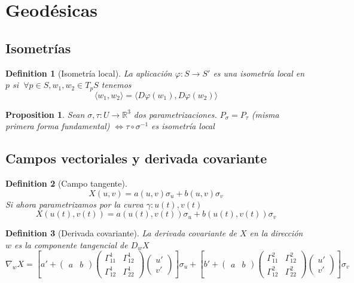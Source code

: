 \documentclass{myclass}
\newtheorem*{definition}{Definition}
\newtheorem*{proposition}{Proposition}
\begin{document}
\section{Geodésicas}
\subsection{Isometrías}
\begin{definition}[Isometría local]
La aplicación $\varphi :S \to  S'$ es una isometría local en $p$ si $\ \forall p\in S, w_1, w_2\in T_pS$ tenemos 
\[
\langle w_1, w_2 \rangle = \langle D\varphi (w_1), D\varphi (w_2) \rangle 
\] 
\end{definition}

\begin{proposition}
Sean $\sigma , \tau :U\to \mathbb{R}^3$ dos parametrizaciones. $P_\sigma  = P_\tau$ (misma primera forma fundamental) $\iff \tau \circ \sigma ^{-1}$ es isometría local
\end{proposition}

\subsection{Campos vectoriales y derivada covariante}
\begin{definition}[Campo tangente]
 \[
X(u, v)= a(u, v)\sigma _u + b (u, v)\sigma_v
\] 
Si ahora parametrizamos por la curva  $\gamma: u(t), v(t)$ 
\[
X(u(t), v(t)) = a(u(t), v(t))\sigma _u + b(u(t), v(t))\sigma _v
\] 
\end{definition}

\begin{definition}[Derivada covariante]
La derivada covariante de $X$ en la dirección $w$ es la componente tangencial de $D_w X$ 
\[
  \nabla _wX = \left[ a' + \begin{pmatrix} a & b \end{pmatrix} \begin{pmatrix} \Gamma_{11}^1 & \Gamma _{12}^1 \\ \Gamma _{12}^1 & \Gamma_{22}^1 \end{pmatrix} \begin{pmatrix} u' \\ v' \end{pmatrix}   \right] \sigma _u + \left[ b' + \begin{pmatrix} a & b \end{pmatrix} \begin{pmatrix} \Gamma _{11}^2 & \Gamma _{12}^2 \\ \Gamma _{12}^2 & \Gamma _{22}^2 \end{pmatrix} \begin{pmatrix} u' \\ v' \end{pmatrix}   \right] \sigma _v
\] 
\end{definition}
\end{document}

